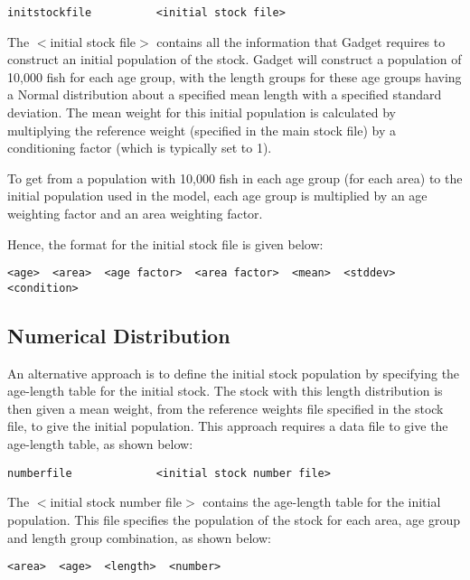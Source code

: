 \documentclass [a4paper, 10pt]{book}
\begin{document}
{\small\begin{verbatim}
initstockfile          <initial stock file>
\end{verbatim}}

The $<$initial stock file$>$ contains all the information that Gadget requires to construct an initial population of the stock.  Gadget will construct a population of 10,000 fish for each age group, with the length groups for these age groups having a Normal distribution about a specified mean length with a specified standard deviation.  The mean weight for this initial population is calculated by multiplying the reference weight (specified in the main stock file) by a conditioning factor (which is typically set to 1).

\bigskip
To get from a population with 10,000 fish in each age group (for each area) to the initial population used in the model, each age group is multiplied by an age weighting factor and an area weighting factor.

\bigskip
Hence, the format for the initial stock file is given below:

{\small\begin{verbatim}
<age>  <area>  <age factor>  <area factor>  <mean>  <stddev>  <condition>
\end{verbatim}}

\subsection{Numerical Distribution}
An alternative approach is to define the initial stock population by specifying the age-length table for the initial stock.  The stock with this length distribution is then given a mean weight, from the reference weights file specified in the stock file, to give the initial population.  This approach requires a data file to give the age-length table, as shown below:

{\small\begin{verbatim}
numberfile             <initial stock number file>
\end{verbatim}}

The $<$initial stock number file$>$ contains the age-length table for the initial population.  This file specifies the population of the stock for each area, age group and length group combination, as shown below:

{\small\begin{verbatim}
<area>  <age>  <length>  <number>
\end{verbatim}}
\end{document}
